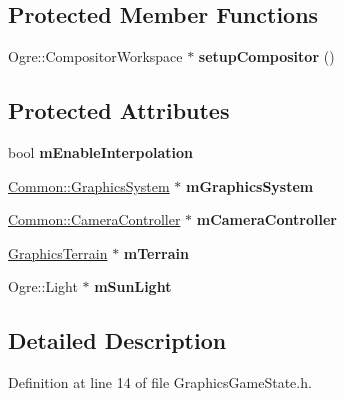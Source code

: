 \subsection*{Protected Member Functions}
\begin{DoxyCompactItemize}
\item 
\mbox{\label{class_graphics_game_state_a5cb40a6795b789595dbdec2c28f420b8}} 
Ogre\+::\+Compositor\+Workspace $\ast$ {\bfseries setup\+Compositor} ()
\end{DoxyCompactItemize}
\subsection*{Protected Attributes}
\begin{DoxyCompactItemize}
\item 
\mbox{\label{class_graphics_game_state_ad6d8656a6af5861d756f8e677a06567d}} 
bool {\bfseries m\+Enable\+Interpolation}
\item 
\mbox{\label{class_graphics_game_state_a6931ab79c90541e4e3cc93cd79a733f6}} 
\hyperlink{class_common_1_1_graphics_system}{Common\+::\+Graphics\+System} $\ast$ {\bfseries m\+Graphics\+System}
\item 
\mbox{\label{class_graphics_game_state_a2debaa701782161be4b2376872a9194c}} 
\hyperlink{class_common_1_1_camera_controller}{Common\+::\+Camera\+Controller} $\ast$ {\bfseries m\+Camera\+Controller}
\item 
\mbox{\label{class_graphics_game_state_a9f260815846c0fc225ff59a2dda90b27}} 
\hyperlink{class_graphics_terrain}{Graphics\+Terrain} $\ast$ {\bfseries m\+Terrain}
\item 
\mbox{\label{class_graphics_game_state_a59e90f7396f9ae5db563c3be4ac89139}} 
Ogre\+::\+Light $\ast$ {\bfseries m\+Sun\+Light}
\end{DoxyCompactItemize}


\subsection{Detailed Description}


Definition at line 14 of file Graphics\+Game\+State.\+h.



